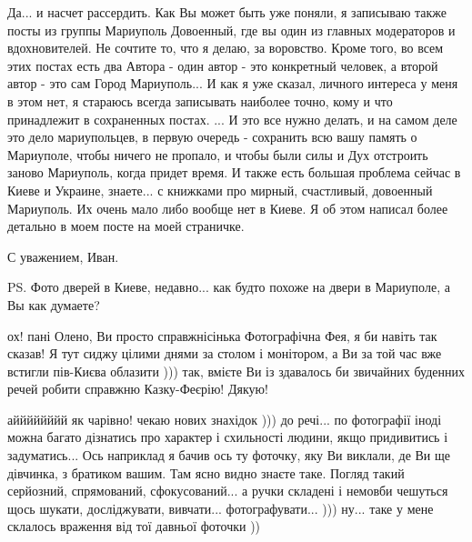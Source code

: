 Да... и насчет рассердить. Как Вы может быть уже поняли, я записываю также
посты из группы Мариуполь Довоенный, где вы один из главных модераторов и
вдохновителей. Не сочтите то, что я делаю, за воровство. Кроме того, во всем
этих постах есть два Автора - один автор - это конкретный человек, а второй
автор - это сам Город Мариуполь... И как я уже сказал, личного интереса у меня
в этом нет, я стараюсь всегда записывать наиболее точно, кому и что принадлежит
в сохраненных постах.  ... И это все нужно делать, и на самом деле это дело
мариупольцев, в первую очередь - сохранить всю вашу память о Мариуполе,  чтобы
ничего не пропало, и чтобы были силы и Дух отстроить заново Мариуполь, когда
придет время.  И также есть большая проблема сейчас в Киеве и Украине,
знаете... с книжками про мирный, счастливый, довоенный Мариуполь. Их очень мало
либо вообще нет в Киеве.  Я об этом написал более детально в моем посте на моей
страничке. 

С уважением, Иван.

PS. Фото дверей в Киеве, недавно... как будто похоже на двери в Мариуполе,
а Вы как думаете?

ох! пані Олено, Ви просто справжнісінька Фотографічна Фея, я би навіть так
сказав! Я тут сиджу цілими днями за столом і монітором, а Ви за той час вже
встигли пів-Києва облазити ))) так, вмієте Ви із здавалось би звичайних
буденних речей робити справжню Казку-Феєрію! Дякую!

айййййййй як чарівно! чекаю нових знахідок ))) до речі... по фотографії іноді
можна багато дізнатись про характер і схильності людини, якщо придивитись і
задуматись...  Ось наприклад я бачив ось ту фоточку, яку Ви виклали, де Ви ще
дівчинка, з братиком вашим. Там ясно видно знаєте таке. Погляд такий серйозний,
спрямований, сфокусований... а ручки складені і немовби чешуться щось шукати,
досліджувати, вивчати... фотографувати... ))) ну... таке у мене склалось
враження від тої давньої фоточки ))
